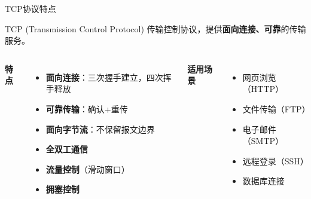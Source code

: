 \documentclass[10pt, aspectratio=169]{beamer}
\begin{document}
\begin{frame}{TCP协议特点}
    \begin{block}{TCP (Transmission Control Protocol)}
        传输控制协议，提供\textbf{面向连接、可靠}的传输服务。
    \end{block}
    \vspace{0.3em}
    \begin{columns}[t]
        \textbf{特点}
        \begin{itemize}
            \item \textbf{面向连接}：三次握手建立，四次挥手释放
            \item \textbf{可靠传输}：确认+重传
            \item \textbf{面向字节流}：不保留报文边界
            \item \textbf{全双工通信}
            \item \textbf{流量控制}（滑动窗口）
            \item \textbf{拥塞控制}
        \end{itemize}
        \textbf{适用场景}
        \begin{itemize}
            \item 网页浏览（HTTP）
            \item 文件传输（FTP）
            \item 电子邮件（SMTP）
            \item 远程登录（SSH）
            \item 数据库连接
        \end{itemize}
    \end{columns}
\end{frame}
\end{document}
